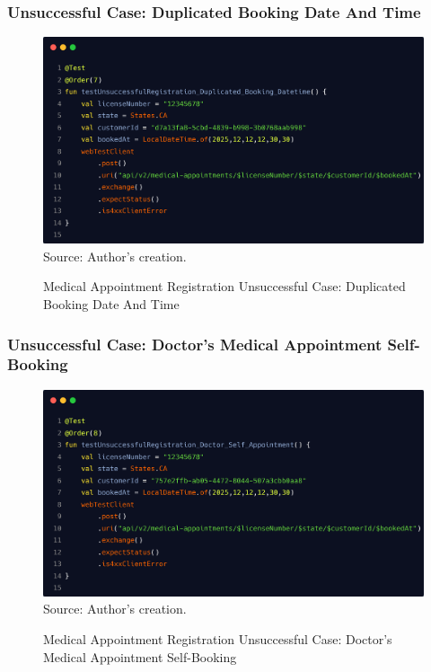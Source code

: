 \subsubsection{Unsuccessful Case: Duplicated Booking Date And Time}

\begin{figure}[H]
	\centering
	\caption{Medical Appointment Registration Unsuccessful Case: Duplicated Booking Date And Time}
	\includegraphics[width=1\linewidth]{figures/medical_appointment_registration_integration_test_unsuccessful_case_duplicared_booking_datetime.png}
	\label{fig:medical_appointment_registration_integration_test_unsuccessful_case_duplicared_booking_datetime}
	\footnotesize Source: Author's creation.
\end{figure}

\subsubsection{Unsuccessful Case: Doctor's Medical Appointment Self-Booking}

\begin{figure}[H]
	\centering
	\caption{Medical Appointment Registration Unsuccessful Case: Doctor's Medical Appointment Self-Booking}
	\includegraphics[width=1\linewidth]{figures/medical_appointment_registration_integration_test_unsuccessful_case_doctor_self_booking.png}
	\label{fig:medical_appointment_registration_integration_test_unsuccessful_case_doctor_self_booking}
	\footnotesize Source: Author's creation.
\end{figure}

